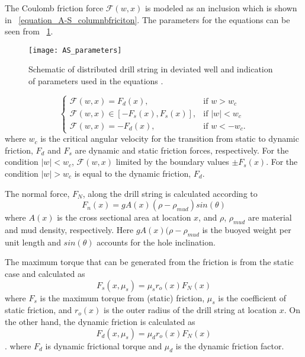 The Coulomb friction force $\mathcal{F}(w,x)$ is modeled as an inclusion which is shown in \equationname~\ref{equation_A-S_columnbfriciton}. The parameters for the equations can be seen from \figurename~\ref{figure_AS_equation_schematic}.
\begin{figure}
  \centering
  \texttt{[image: AS\_parameters]}
  \caption[Schematic of distributed drill string in deviated well]{Schematic of distributed drill string in deviated well and indication of parameters used in the equations \cite{ref:aarsnes2017a}.}\label{figure_AS_equation_schematic}
\end{figure}
\begin{equation}\label{equation_A-S_columnbfriciton}
  \begin{cases}
     \mathcal{F}(w,x) = F_{d}(x), & \mbox{if } w>w_c \\
     \mathcal{F}(w,x) \in [-F_{s}(x), F_{s}(x)], & \mbox{if } |w|<w_c \ \\
     \mathcal{F}(w,x) = -F_{d}(x), & \mbox{if } w < -w_c.
  \end{cases}
\end{equation}
where $w_c$ is the critical angular velocity for the transition from static to dynamic friction, $F_{d}$ and $F_{s}$ are dynamic and static friction forces, respectively. For the condition $|w|<w_c$, $\mathcal{F}(w,x)$ limited by the boundary values $\pm F_{s}(x)$.  For the condition $|w|>w_c$ is equal to the dynamic friction, $F_{d}$.

The normal force, $F_N$, along the drill string is calculated according to
\begin{equation}\label{equation_AS_normal_force}
  F_n(x) = gA(x)(\rho-\rho_{mud})sin(\theta)
\end{equation}
where $A(x)$ is the cross sectional area at location $x$, and $\rho$, $\rho_{mud}$ are material and mud density, respectively.  Here $gA(x)(\rho-\rho_{mud}$ is the buoyed weight per unit length and $sin(\theta)$ accounts for the hole inclination.

The maximum torque that can be generated from the friction is from the static case and calculated as
\begin{equation}\label{equation_A-S_static_fric}
  F_{s}(x,\mu_s) = \mu_s r_o(x) F_N(x)
\end{equation}
where $F_{s}$ is the maximum torque from (static) friction, $\mu_s$ is the coefficient of static friction, and $r_o(x)$ is the outer radius of the drill string at location $x$. On the other hand, the dynamic friction is calculated as \resolvedcomment{}
\begin{equation}\label{equation_A-S_dynamic_fric}
  F_{d}(x,\mu_s) = \mu_d r_o(x) F_N(x)
\end{equation}.
where $F_d$ is dynamic frictional torque and $\mu_d$ is the dynamic friction factor. 
 
